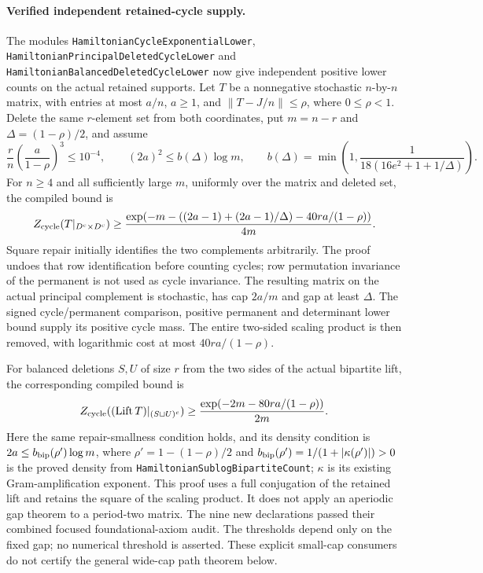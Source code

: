 \paragraph{Verified independent retained-cycle supply.}
The modules \texttt{HamiltonianCycleExponentialLower},
\texttt{HamiltonianPrincipalDeletedCycleLower} and
\texttt{HamiltonianBalancedDeletedCycleLower} now give independent
positive lower counts on the actual retained supports.
Let \(T\) be a nonnegative stochastic \(n\)-by-\(n\) matrix,
with entries at most \(a/n\), \(a\geq1\), and
\(\|T-J/n\|\leq\rho\), where \(0\leq\rho<1\).
Delete the same \(r\)-element set from both coordinates,
put \(m=n-r\) and \(\Delta=(1-\rho)/2\), and assume
\[
 \frac r n\left(\frac a{1-\rho}\right)^3\leq10^{-4},
 \qquad
 (2a)^2\leq b(\Delta)\log m,
 \qquad
 b(\Delta)=\min\left(1,\frac1{18(16e^2+1+1/\Delta)}\right).
\]
For \(n\geq4\) and all sufficiently large \(m\), uniformly over
the matrix and deleted set, the compiled bound is
\[
 Z_{\rm cycle}(T|_{D^c\times D^c})
 \geq\frac{\exp\!\left(
       -m-((2a-1)+(2a-1)/\Delta)
          -40ra/(1-\rho)\right)}{4m}.
\]
Square repair initially identifies the two complements arbitrarily.
The proof undoes that row identification before counting cycles;
row permutation invariance of the permanent is not used as cycle
invariance. The resulting matrix on the actual principal complement
is stochastic, has cap \(2a/m\) and gap at least \(\Delta\).
The signed cycle/permanent comparison, positive permanent and
determinant lower bound supply its positive cycle mass.
The entire two-sided scaling product is then removed, with logarithmic
cost at most \(40ra/(1-\rho)\).

For balanced deletions \(S,U\) of size \(r\) from the two sides of
the actual bipartite lift, the corresponding compiled bound is
\[
 Z_{\rm cycle}((\operatorname{Lift}T)|_{(S\sqcup U)^c})
       \geq\frac{\exp(-2m-80ra/(1-\rho))}{2m}.
\]
Here the same repair-smallness condition holds, and its density
condition is \(2a\leq b_{\rm bip}(\rho')\log m\), where
\(\rho'=1-(1-\rho)/2\) and
\(b_{\rm bip}(\rho')=1/(1+|\kappa(\rho')|)>0\) is the proved
density from \texttt{HamiltonianSublogBipartiteCount};
\(\kappa\) is its existing Gram-amplification exponent.
This proof uses a full conjugation of the retained lift and retains
the square of the scaling product. It does not apply an aperiodic
gap theorem to a period-two matrix.
The nine new declarations passed their combined focused
foundational-axiom audit. The thresholds depend only on the fixed gap;
no numerical threshold is asserted. These explicit small-cap
consumers do not certify the general wide-cap path theorem below.




